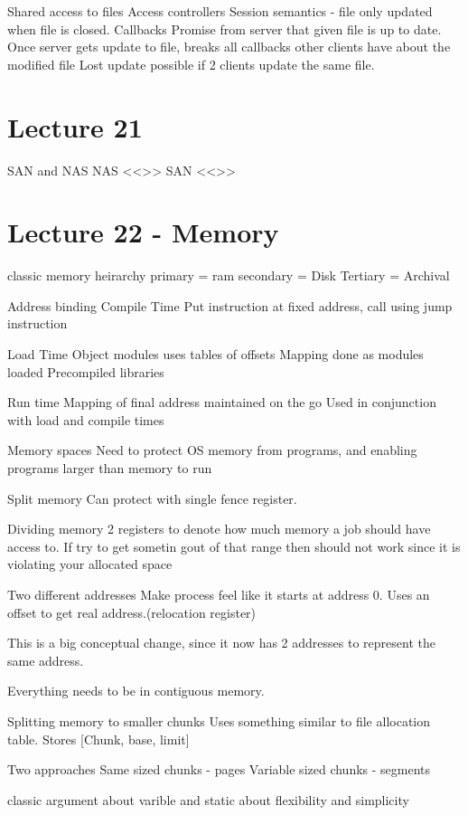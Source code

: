 \documentclass{article}
\begin{document}
		Shared access to files
			Access controllers
			Session semantics - file only updated when file is closed.
			Callbacks
				Promise from server that given file is up to date.
				Once server gets update to file, breaks all callbacks other clients have about the modified file
				Lost update possible if 2 clients update the same file.


\section{Lecture 21}
	SAN and NAS
		NAS <<>>
		SAN <<>>

\section{Lecture 22 - Memory}
	classic memory heirarchy
		primary = ram
		secondary = Disk
		Tertiary = Archival

	Address binding
		Compile Time
			Put instruction at fixed address, call using jump instruction

		Load Time
			Object modules uses tables of offsets
			Mapping done as modules loaded
			Precompiled libraries

		Run time
			Mapping of final address maintained on the go
			Used in conjunction with load and compile times

	Memory spaces
		Need to protect OS memory from programs, and enabling programs larger than memory to run

		Split memory
			Can protect with single fence register. 

	Dividing memory
		2 registers to denote how much memory a job should have access to. If try to get sometin gout of that range then should not work since it is violating your allocated space

	Two different addresses
		Make process feel like it starts at address 0. Uses an offset to get real address.(relocation register)

		This is a big conceptual change, since it now has 2 addresses to represent the same address.

		Everything needs to be in contiguous memory.


	Splitting memory to smaller chunks
		Uses something similar to file allocation table.
		Stores [Chunk, base, limit]

		Two approaches
			Same sized chunks - pages
			Variable sized chunks - segments

			classic argument about varible and static about flexibility and simplicity
\end{document}
